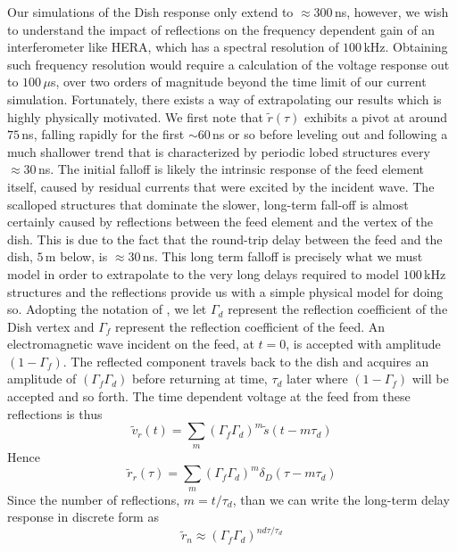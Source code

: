 \documentclass[onecolumn]{emulateapj}
\begin{document}
Our simulations of the Dish response only extend to $\approx 300$\,ns, however, we wish to understand the impact of reflections on the frequency dependent gain of an interferometer like HERA, which has a spectral resolution of $100$\,kHz. Obtaining such frequency resolution would require a calculation of the voltage response out to $100$\,$\mu$s, over two orders of magnitude beyond the time limit of our current simulation. Fortunately, there exists a way of extrapolating our results which is highly physically motivated. We first note that $\widetilde{r}(\tau)$ exhibits a pivot at around $75$\,ns, falling rapidly for the first $\sim 60$\,ns or so before leveling out and following a much shallower trend that is characterized by periodic lobed structures every $\approx 30$\,ns. The initial falloff is likely the intrinsic response of the feed element itself, caused by residual currents that were excited by the incident wave. The scalloped structures that dominate the slower, long-term fall-off is almost certainly caused by reflections between the feed element and the vertex of the dish. This is due to the fact that the round-trip delay between the feed and the dish, $5$\,m below, is $\approx 30$\,ns. This long term falloff is precisely what we must model in order to extrapolate to the very long delays required to model $100$\,kHz structures and the reflections provide us with a simple physical model for doing so. Adopting the notation of \citep{Patra:2015}, we let $\Gamma_d$ represent the reflection coefficient of the Dish vertex and $\Gamma_f$ represent the reflection coefficient of the feed. An electromagnetic wave incident on the feed, at $t=0$, is accepted with amplitude $(1-\Gamma_f)$. The reflected component travels back to the dish and acquires an amplitude of $(\Gamma_f \Gamma_d)$ before returning at time, $\tau_d$ later where $(1-\Gamma_f)$ will be accepted and so forth. The time dependent voltage at the feed from these reflections is thus
\begin{equation}
\widetilde{v}_r(t) = \sum_m \left( \Gamma_f \Gamma_d \right)^m \widetilde{s}(t-m \tau_d)
\end{equation}
Hence
\begin{equation}
\widetilde{r}_r(\tau) = \sum_m \left( \Gamma_f \Gamma_d \right)^m \delta_D(\tau-m\tau_d)
\end{equation}
Since the number of reflections, $m=t/\tau_d$, than we can write the long-term delay response in discrete form as 
\begin{equation}
\widetilde{r}_n \approx (\Gamma_f \Gamma_d)^{n d\tau/\tau_d}
\end{equation}
\end{document}
